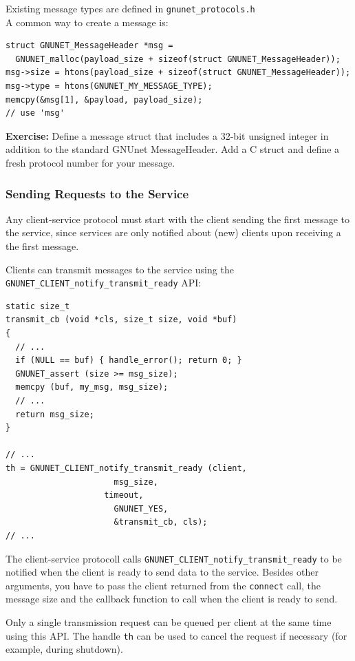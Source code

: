 \documentclass[10pt]{article}
\newcommand{\exercise}[1]{\noindent\begin{boxedminipage}{\textwidth}{\bf Exercise:} #1 \end{boxedminipage}}
\begin{document}
Existing message types are defined in {\tt gnunet\_protocols.h}\\
A common way to create a message is:

\lstset{language=c}
\begin{lstlisting}
struct GNUNET_MessageHeader *msg = 
  GNUNET_malloc(payload_size + sizeof(struct GNUNET_MessageHeader));
msg->size = htons(payload_size + sizeof(struct GNUNET_MessageHeader));
msg->type = htons(GNUNET_MY_MESSAGE_TYPE);
memcpy(&msg[1], &payload, payload_size);
// use 'msg'
\end{lstlisting}

\exercise{Define a message struct that includes a 32-bit
unsigned integer in addition to the standard GNUnet MessageHeader.
Add a C struct and define a fresh protocol number for your message.}


\subsubsection{Sending Requests to the Service}

Any client-service protocol must start with the client sending the
first message to the service, since services are only notified about
(new) clients upon receiving a the first message.

Clients can transmit messages to the service using the
{\tt GNUNET\_CLIENT\_notify\_transmit\_ready} API:
\lstset{language=c}
\begin{lstlisting}
static size_t
transmit_cb (void *cls, size_t size, void *buf)
{
  // ...
  if (NULL == buf) { handle_error(); return 0; }
  GNUNET_assert (size >= msg_size);
  memcpy (buf, my_msg, msg_size);
  // ...
  return msg_size;
}

// ...	
th = GNUNET_CLIENT_notify_transmit_ready (client,
					  msg_size,
 				    timeout,
					  GNUNET_YES,
					  &transmit_cb, cls);
// ...
\end{lstlisting}

The client-service protocoll calls {\tt GNUNET\_CLIENT\_notify\_transmit\_ready}
to be notified when the client is ready to send data to the service. 
Besides other arguments, you have to pass the client returned 
from the {\tt connect} call, the message size and the callback function to 
call when the client is ready to send. 

Only a single transmission request can be queued per client at the
same time using this API.  The handle {\tt th} can be used to cancel
the request if necessary (for example, during shutdown).  
\end{document}

